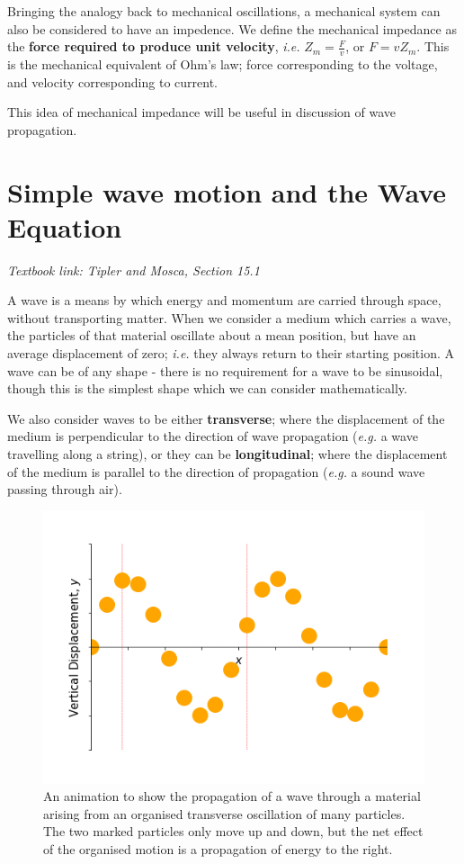 \documentclass[
]{book}
\begin{document}
Bringing the analogy back to mechanical oscillations, a mechanical system can also be considered to have an impedence. We define the mechanical impedance as the \textbf{force required to produce unit velocity}, \emph{i.e.} \(Z_m = \frac{F}{v}\), or \(F = vZ_m\). This is the mechanical equivalent of Ohm's law; force corresponding to the voltage, and velocity corresponding to current.

This idea of mechanical impedance will be useful in discussion of wave propagation.

\hypertarget{sec:ch6-wavemotion}{%
\chapter{Simple wave motion and the Wave Equation}\label{sec:ch6-wavemotion}}

\emph{Textbook link: Tipler and Mosca, Section 15.1}

A wave is a means by which energy and momentum are carried through space, without transporting matter. When we consider a medium which carries a wave, the particles of that material oscillate about a mean position, but have an average displacement of zero; \emph{i.e.} they always return to their starting position. A wave can be of any shape - there is no requirement for a wave to be sinusoidal, though this is the simplest shape which we can consider mathematically.

We also consider waves to be either \textbf{transverse}; where the displacement of the medium is perpendicular to the direction of wave propagation (\emph{e.g.} a wave travelling along a string), or they can be \textbf{longitudinal}; where the displacement of the medium is parallel to the direction of propagation (\emph{e.g.} a sound wave passing through air).

\begin{figure}

{\centering \includegraphics[width=0.7\linewidth]{visualisations/ch6-transversewave2} 

}

\caption{An animation to show the propagation of a wave through a material arising from an organised transverse oscillation of many particles. The two marked particles only move up and down, but the net effect of the organised motion is a propagation of energy to the right.}\label{fig:ch6-transversewaveill1}
\end{figure}
\end{document}
